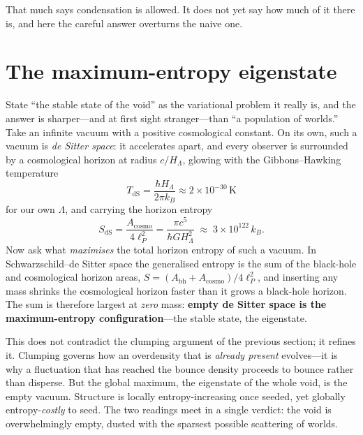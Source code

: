That much says condensation is allowed. It does not yet say how much of it there
is, and here the careful answer overturns the naive one.

\section{The maximum-entropy eigenstate}
\label{sec:void-eigenstate}

State ``the stable state of the void'' as the variational problem it really is, and
the answer is sharper---and at first sight stranger---than ``a population of worlds.'' Take an
infinite vacuum with a positive cosmological constant. On its own, such a vacuum
is \emph{de Sitter space}: it accelerates apart, and every observer is surrounded
by a cosmological horizon at radius $c/H_\Lambda$, glowing with the
Gibbons--Hawking temperature
\[
  T_{\mathrm{dS}} = \frac{\hbar H_\Lambda}{2\pi k_B}
  \approx 2\times10^{-30}\,\mathrm{K}
\]
for our own $\Lambda$, and carrying the horizon entropy
\begin{equation}
  S_{\mathrm{dS}} = \frac{A_{\mathrm{cosmo}}}{4\ell_P^2}
  = \frac{\pi c^5}{\hbar G H_\Lambda^2}
  \;\approx\; 3\times10^{122}\,k_B .
  \label{eq:gibbons-hawking}
\end{equation}
Now ask what \emph{maximises} the total horizon entropy of such a vacuum. In
Schwarzschild--de Sitter space the generalised entropy is the sum of the
black-hole and cosmological horizon areas, $S=(A_{\mathrm{bh}}+A_{\mathrm{cosmo}})/
4\ell_P^2$, and inserting any mass shrinks the cosmological horizon faster than it
grows a black-hole horizon. The sum is therefore largest at \emph{zero} mass:
\textbf{empty de Sitter space is the maximum-entropy configuration}---the stable
state, the eigenstate.

This does not contradict the clumping argument of the previous section; it refines
it. Clumping governs how an overdensity that is \emph{already present} evolves---it
is why a fluctuation that has reached the bounce density proceeds to bounce rather
than disperse. But the global maximum, the eigenstate of the whole void, is the
empty vacuum. Structure is locally entropy-increasing once seeded, yet globally
entropy-\emph{costly} to seed. The two readings meet in a single verdict: the void
is overwhelmingly empty, dusted with the sparsest possible scattering of worlds.

